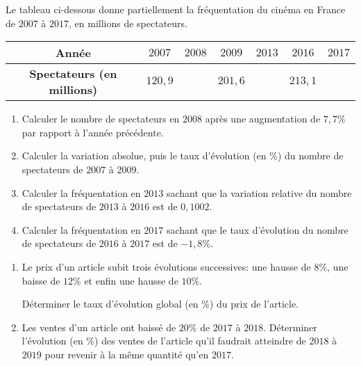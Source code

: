 \documentclass[a4paper]{article}
\begin{document}
  
  \medskip
  \pagebreak
  \begin{exercice}{}{}
  
    Le tableau ci-dessous donne partiellement la fréquentation du cinéma en France de $2007$ à $2017$, en millions de spectateurs.
  
  
  \begin{center}
    \begin{tabular}{|c|c|c|c|c|c|c|}
      \hline 
      \cellcolor{Blue!15!white}\textbf{Année} &  $2007$ & $2008$ & $2009$ & $2013$ & $2016$ & $2017$\\
      \hline
      \cellcolor{Blue!15!white}\textbf{Spectateurs (en millions)} & $120,9$ & & $201,6$ & & $213,1$ & \\
      \hline
    \end{tabular}
  \end{center}
  
  \begin{enumerate}
    \item Calculer le nombre de spectateurs en $2008$ après une augmentation de $7,7\%$ par rapport à l'année précédente.
    \item Calculer la variation absolue, puis le taux d'évolution (en \%) du nombre de spectateurs de $2007$ à $2009$.
    \item Calculer la fréquentation en $2013$ sachant que la variation relative du nombre de spectateurs de $2013$ à $2016$ est de $0,1002$.
    \item Calculer la fréquentation en $2017$ sachant que le taux d'évolution du nombre de spectateurs de $2016$ à $2017$ est de $-1,8\%$.
  \end{enumerate}
  
  \end{exercice}
  
  
  \medskip
  
  \begin{exercice}{}{}
    \begin{enumerate}
      \item Le prix d'un article subit trois évolutions successives: une hausse de $8\%$, une baisse de $12\%$ et enfin une hausse de $10\%$.
      
      Déterminer le taux d'évolution global (en \%) du prix de l'article.
  
      \item Les ventes d'un article ont baissé de $20\%$ de $2017$ à $2018$.
      Déterminer l'évolution (en \%) des ventes de l'article qu'il faudrait atteindre de $2018$ à $2019$ pour
      revenir à la même quantité qu'en $2017$.
    \end{enumerate}
  \end{exercice}
  
\end{document}
